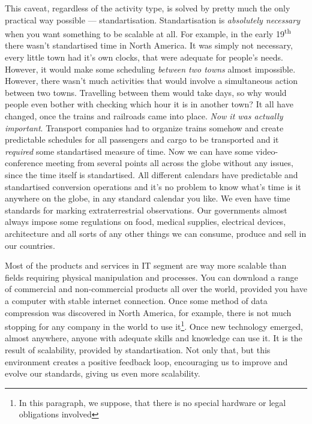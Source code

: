 \documentclass{article}
\begin{document}
            This caveat, regardless of the activity type, is solved by pretty much the only practical way possible --- standartisation. Standartisation 
            is \emph{absolutely necessary} when you want something to be scalable at all. For example, in the early 19\textsuperscript{th} there wasn't standartised time 
            in North America. It was simply not necessary, every little town had it's own clocks, that were adequate for people's needs. However, it would make some 
            scheduling \emph{between two towns} almost impossible. However, there wasn't much activities that would involve a simultaneous action between two towns. 
            Travelling between them would take days, so why would people even bother with checking which hour it is in another town? It all have changed, once the trains
            and railroads came into place. \emph{Now it was actually important}. Transport companies had to organize trains somehow and create predictable schedules for all
            passengers and cargo to be transported and it \emph{required} some standartised measure of time. Now we can have some video-conference meeting from several points 
            all across the globe without any issues, since the time itself is standartised. All different calendars have predictable and standartised conversion operations and
            it's no problem to know what's time is it anywhere on the globe, in any standard calendar you like. We even have time standards for marking extraterrestrial observations. 
            Our governments almost always impose some regulations on food, medical supplies, electrical devices, architecture and all sorts of any other things we can consume, 
            produce and sell in our countries.\par

            Most of the products and services in IT segment are way more scalable than fields requiring physical manipulation and processes. You can download a range of
            commercial and non-commercial products all over the world, provided you have a computer with stable internet connection. Once some method of data compression 
            was discovered in North America, for example, there is not much stopping for any company in the world to use it\footnote{In this paragraph, we suppose, that 
            there is no special hardware or legal obligations involved}. Once new technology emerged, almost anywhere, anyone with adequate skills and knowledge can use it.
            It is the result of scalability, provided by standartisation. Not only that, but this environment creates a positive feedback loop, encouraging us to 
            improve and evolve our standards, giving us even more scalability.\par
            
\end{document}
